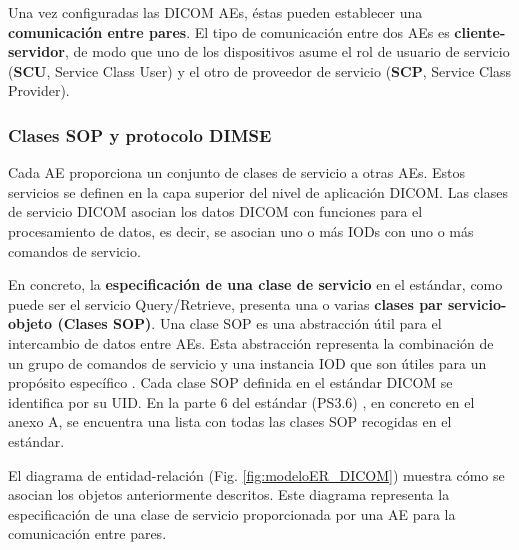 Una vez configuradas las DICOM AEs, éstas pueden establecer una \textbf{comunicación entre pares}. El tipo de comunicación entre dos AEs es \textbf{cliente-servidor}, de modo que uno de los dispositivos asume el rol de usuario de servicio (\textbf{SCU}, Service Class User) y el otro de proveedor de servicio (\textbf{SCP}, Service Class Provider).

\subsubsection{Clases SOP y protocolo DIMSE}
Cada AE proporciona un conjunto de clases de servicio a otras AEs. Estos servicios se definen en la capa superior del nivel de aplicación DICOM. Las clases de servicio DICOM asocian los datos DICOM con funciones para el procesamiento de datos, es decir, se asocian uno o más IODs con uno o más comandos de servicio.

En concreto, la \textbf{especificación de una clase de servicio} en el estándar, como puede ser el servicio Query/Retrieve, presenta una o varias \textbf{clases par servicio-objeto (Clases SOP)}. Una clase SOP es una abstracción útil para el intercambio de datos entre AEs. Esta abstracción representa la combinación de un grupo de comandos de servicio y una instancia IOD que son útiles para un propósito específico \cite{15}. Cada clase SOP definida en el estándar DICOM se identifica por su UID. En la parte 6 del estándar (PS3.6) \cite{14}, en concreto en el anexo A, se encuentra una lista con todas las clases SOP recogidas en el estándar.

El diagrama de entidad-relación (Fig. \ref{fig:modeloER_DICOM}) muestra cómo se asocian los objetos anteriormente descritos. Este diagrama representa la especificación de una clase de servicio proporcionada por una AE para la comunicación entre pares.

